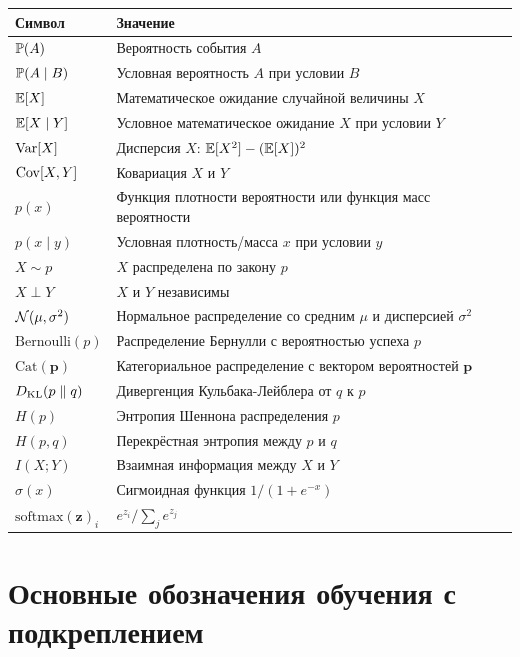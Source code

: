 \begin{center}
\begin{tabular}{@{}ll@{}}
\toprule
\textbf{Символ} & \textbf{Значение} \\
\midrule
$\mathbb{P}(A)$          & Вероятность события $A$ \\
$\mathbb{P}(A\mid B)$    & Условная вероятность $A$ при условии $B$ \\
$\operatorname{\mathbb{E}}[X]$             & Математическое ожидание случайной величины $X$ \\
$\operatorname{\mathbb{E}}[X \mid Y]$      & Условное математическое ожидание $X$ при условии $Y$ \\
$\operatorname{Var}[X]$           & Дисперсия $X$: $\operatorname{\mathbb{E}}[X^2]-(\operatorname{\mathbb{E}}[X])^2$ \\
$\operatorname{Cov}[X,Y]$         & Ковариация $X$ и $Y$ \\
$p(x)$              & Функция плотности вероятности или функция масс вероятности \\
$p(x \mid y)$       & Условная плотность/масса $x$ при условии $y$ \\
$X \sim p$          & $X$ распределена по закону $p$ \\
$X \perp Y$         & $X$ и $Y$ независимы \\
$\mathcal{N}(\mu,\sigma^2)$ & Нормальное распределение со средним $\mu$ и дисперсией $\sigma^2$ \\
$\mathrm{Bernoulli}(p)$ & Распределение Бернулли с вероятностью успеха $p$ \\
$\mathrm{Cat}(\mathbf{p})$ & Категориальное распределение с вектором вероятностей $\mathbf{p}$ \\
$D_{\mathrm{KL}}\!\left(p\;\|\;q\right)$         & Дивергенция Кульбака-Лейблера от $q$ к $p$ \\
$H(p)$              & Энтропия Шеннона распределения $p$ \\
$H(p,q)$            & Перекрёстная энтропия между $p$ и $q$ \\
$I(X;Y)$            & Взаимная информация между $X$ и $Y$ \\
$\sigma(x)$         & Сигмоидная функция $1/(1+e^{-x})$ \\
$\mathrm{softmax}(\mathbf{z})_i$ & $e^{z_i}/\sum_j e^{z_j}$ \\
\bottomrule
\end{tabular}
\end{center}

\section*{Основные обозначения обучения с подкреплением}

